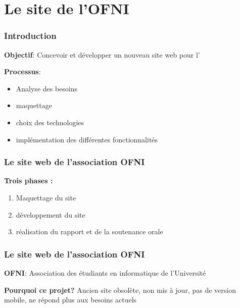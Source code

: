 \section{Le site de l'OFNI}

\begin{frame}
    \frametitle{Introduction}
    \centering
    \textbf{Objectif}: Concevoir et développer un nouveau site web pour l’\ofni
    \vspace{1cm}

    \pause

    \textbf{Processus}: 
    \begin{itemize}
        \item Analyse des besoins
        \item maquettage
        \item choix des technologies
        \item implémentation des différentes fonctionnalités
    \end{itemize}
\end{frame}

\begin{frame}
    \frametitle{Le site web de l’association OFNI}
    \centering

    \textbf{Trois phases :}
    \bigskip

    \begin{enumerate}
        \item Maquettage du site
        \item développement du site
        \item réalisation du rapport et de la soutenance orale
    \end{enumerate}
\end{frame}

\begin{frame}
    \frametitle{Le site web de l’association OFNI}
    \centering
    \textbf{\textcolor{cardinal}{O}\textcolor{codecyan}{F}\textcolor{codeorange}{N}\textcolor{codegreen}{I}}: Association des étudiants en informatique de l’Université
    \vspace{1cm}

    \textbf{Pourquoi ce projet?} Ancien site obsolète, non mis à jour, pas de version mobile, ne répond plus aux besoins actuels
\end{frame}

